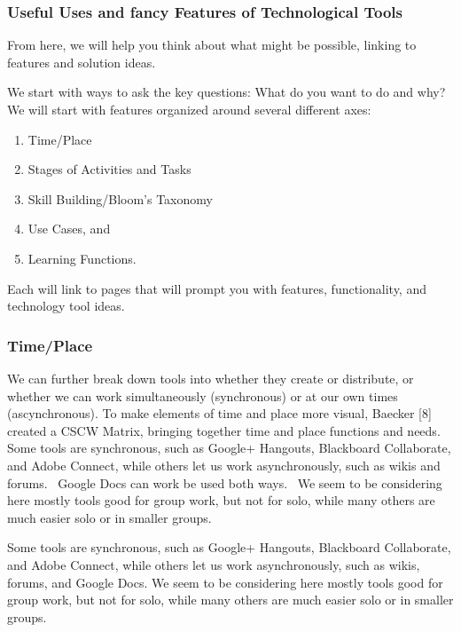 \subsubsection{Useful Uses and fancy Features of Technological
Tools}\label{useful-uses-and-fancy-features-of-technological-tools}

From here, we will help you think about what might be possible, linking
to features and solution ideas.

We start with ways to ask the key questions: What do you want to do and
why? We will start with features organized around several different
axes:

\begin{enumerate}
\def\labelenumi{\arabic{enumi}.}
\item
  Time/Place
\item
  Stages of Activities and Tasks
\item
  Skill Building/Bloom's Taxonomy
\item
  Use Cases, and
\item
  Learning Functions.
\end{enumerate}

Each will link to pages that will prompt you with features,
functionality, and technology tool ideas.

\subsubsection{Time/Place}\label{timeplace}

We can further break down tools into whether they create or distribute,
or whether we can work simultaneously (synchronous) or at our own times
(ascynchronous). To make elements of time and place more visual, Baecker
{{[}8{]}} created a CSCW Matrix, bringing together time and place
functions and needs. Some tools are synchronous, such as Google+
Hangouts, Blackboard Collaborate, and Adobe Connect, while others let us
work asynchronously, such as wikis and forums.~ Google Docs can work be
used both ways.~ We seem to be considering here mostly tools good for
group work, but not for solo, while many others are much easier solo or
in smaller groups.

Some tools are synchronous, such as Google+ Hangouts, Blackboard
Collaborate, and Adobe Connect, while others let us work asynchronously,
such as wikis, forums, and Google Docs. We seem to be considering here
mostly tools good for group work, but not for solo, while many others
are much easier solo or in smaller groups.

